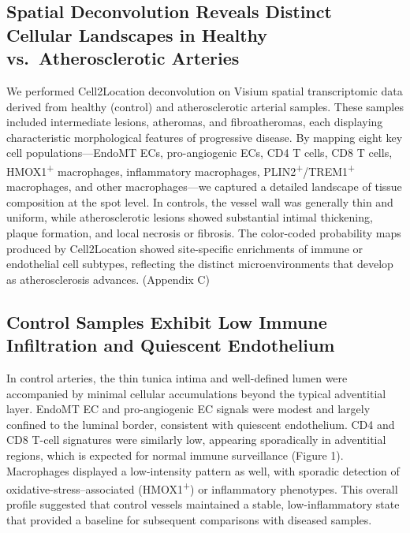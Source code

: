 \documentclass[a4paper,12pt]{article}
\begin{document}
\subsection{Spatial Deconvolution Reveals Distinct Cellular Landscapes in Healthy vs.\ Atherosclerotic Arteries}
We performed Cell2Location deconvolution on Visium spatial transcriptomic data derived from healthy (control) and atherosclerotic arterial samples. These samples included intermediate lesions, atheromas, and fibroatheromas, each displaying characteristic morphological features of progressive disease. By mapping eight key cell populations—EndoMT ECs, pro-angiogenic ECs, CD4 T cells, CD8 T cells, HMOX1\textsuperscript{+} macrophages, inflammatory macrophages, PLIN2\textsuperscript{+}/TREM1\textsuperscript{+} macrophages, and other macrophages—we captured a detailed landscape of tissue composition at the spot level. In controls, the vessel wall was generally thin and uniform, while atherosclerotic lesions showed substantial intimal thickening, plaque formation, and local necrosis or fibrosis. The color-coded probability maps produced by Cell2Location showed site-specific enrichments of immune or endothelial cell subtypes, reflecting the distinct microenvironments that develop as atherosclerosis advances. (Appendix C)

\subsection{Control Samples Exhibit Low Immune Infiltration and Quiescent Endothelium}
In control arteries, the thin tunica intima and well-defined lumen were accompanied by minimal cellular accumulations beyond the typical adventitial layer. EndoMT EC and pro-angiogenic EC signals were modest and largely confined to the luminal border, consistent with quiescent endothelium. CD4 and CD8 T-cell signatures were similarly low, appearing sporadically in adventitial regions, which is expected for normal immune surveillance (Figure 1). Macrophages displayed a low-intensity pattern as well, with sporadic detection of oxidative-stress–associated (HMOX1\textsuperscript{+}) or inflammatory phenotypes. This overall profile suggested that control vessels maintained a stable, low-inflammatory state that provided a baseline for subsequent comparisons with diseased samples.
\end{document}
